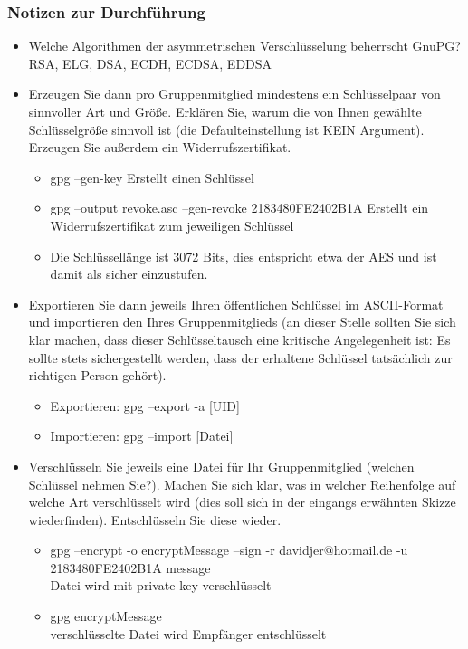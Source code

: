 \documentclass[12pt,a4paper]{article}
\begin{document}
\subsubsection{Notizen zur Durchführung}
\begin{itemize}
    \item Welche Algorithmen der asymmetrischen Verschlüsselung beherrscht GnuPG? RSA, ELG, DSA, ECDH, ECDSA, EDDSA
    \item Erzeugen Sie dann pro Gruppenmitglied mindestens ein Schlüsselpaar von sinnvoller Art und Größe. Erklären Sie, warum die von Ihnen gewählte Schlüsselgröße sinnvoll ist (die Defaulteinstellung ist KEIN Argument). Erzeugen Sie außerdem ein Widerrufszertifikat.
    \begin{itemize}
        \item gpg --gen-key Erstellt einen Schlüssel 
        \item gpg --output revoke.asc --gen-revoke 2183480FE2402B1A Erstellt ein Widerrufszertifikat zum jeweiligen Schlüssel
        \item Die Schlüssellänge ist 3072 Bits, dies entspricht etwa der AES und ist damit als sicher einzustufen.
    \end{itemize}
    \item Exportieren Sie dann jeweils Ihren öffentlichen Schlüssel im ASCII-Format und importieren den Ihres Gruppenmitglieds (an dieser Stelle sollten Sie sich klar machen, dass dieser Schlüsseltausch eine kritische Angelegenheit ist: Es sollte stets sichergestellt werden, dass der erhaltene Schlüssel tatsächlich zur richtigen Person gehört).
    \begin{itemize}
        \item Exportieren: gpg --export -a [UID]
        \item Importieren: gpg --import [Datei]
    \end{itemize}
    \item Verschlüsseln Sie jeweils eine Datei für Ihr Gruppenmitglied (welchen Schlüssel nehmen Sie?). Machen Sie sich klar, was in welcher Reihenfolge auf welche Art verschlüsselt wird (dies soll sich in der eingangs erwähnten Skizze wiederfinden). Entschlüsseln Sie diese wieder.
    \begin{itemize}
        \item gpg --encrypt -o encryptMessage --sign -r davidjer@hotmail.de -u 2183480FE2402B1A message\\ Datei wird mit private key verschlüsselt
        \item gpg encryptMessage\\ verschlüsselte Datei wird Empfänger entschlüsselt

\end{itemize}
\end{itemize}
\end{document}
